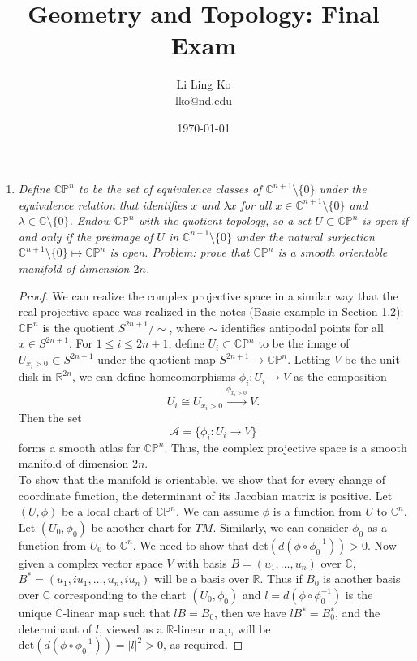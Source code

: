 \documentclass{article}
\begin{document}
\title{Geometry and Topology: Final Exam}
\author{Li Ling Ko\\ lko@nd.edu}
\date{\today}
\maketitle

\begin{enumerate}[label={\bf Q\arabic*:}]
  \item \it Define $\mathbb{C}\mathbb{P}^n$ to be the set of equivalence
    classes of $\mathbb{C}^{n+1}\setminus\{0\}$ under the equivalence
    relation that identifies $x$ and $\lambda x$ for all
    $x\in\mathbb{C}^{n+1}\setminus\{0\}$ and
    $\lambda\in\mathbb{C}\setminus\{0\}$. Endow $\mathbb{C}\mathbb{P}^n$
    with the quotient topology, so a set $U\subset\mathbb{C}\mathbb{P}^n$
    is open if and only if the preimage of $U$ in
    $\mathbb{C}^{n+1}\setminus\{0\}$ under the natural surjection
    $\mathbb{C}^{n+1}\setminus\{0\}\mapsto\mathbb{C}\mathbb{P}^n$ is open.
    Problem: prove that $\mathbb{C}\mathbb{P}^n$ is a smooth orientable
    manifold of dimension $2n$.

    \begin{proof}
      We can realize the complex projective space in a similar way that
      the real projective space was realized in the notes (Basic example in
      Section 1.2): $\mathbb{C}\mathbb{P}^n$ is the quotient
      $S^{2n+1}/\sim$, where $\sim$ identifies antipodal points for all
      $x\in S^{2n+1}$. For $1\leq i\leq 2n+1$, define
      $U_i\subset\mathbb{C}\mathbb{P}^n$ to be the image of
      $U_{x_i>0}\subset S^{2n+1}$ under the quotient map
      $S^{2n+1}\rightarrow\mathbb{C}\mathbb{P}^n$. Letting $V$ be the unit
      disk in $\mathbb{R}^{2n}$, we can define homeomorphisms
      $\phi_i:U_i\rightarrow V$ as the composition
      \[U_i\cong U_{x_i>0}\xrightarrow{\phi_{x_i>0}} V.\]
      Then the set
      \[\mathcal{A}=\{\phi_i:U_i\rightarrow V\}\]
      forms a smooth atlas for $\mathbb{C}\mathbb{P}^n$. Thus, the
      complex projective space is a smooth manifold of dimension $2n$. \\

      To show that the manifold is orientable, we show that for every
      change of coordinate function, the determinant of its Jacobian matrix
      is positive. Let $(U,\phi)$ be a local chart of
      $\mathbb{C}\mathbb{P}^n$. We can assume $\phi$ is a function from $U$
      to $\mathbb{C}^n$. Let $(U_0,\phi_0)$ be another chart for $TM$.
      Similarly, we can consider $\phi_0$ as a function from $U_0$ to
      $\mathbb{C}^n$. We need to show that
      $\text{det}(d(\phi\circ\phi_0^{-1}))>0$. Now given a complex vector
      space $V$ with basis $B=(u_1,\ldots,u_n)$ over $\mathbb{C}$,
      $B^*=(u_1,iu_1,\ldots,u_n,iu_n)$ will be a basis over $\mathbb{R}$.
      Thus if $B_0$ is another basis over $\mathbb{C}$ corresponding to the
      chart $(U_0,\phi_0)$ and $l=d(\phi\circ\phi_0^{-1})$ is the unique
      $\mathbb{C}$-linear map such that $lB=B_0$, then we have
      $lB^∗=B^∗_0$, and the determinant of $l$, viewed as a
      $\mathbb{R}$-linear map, will be
      $\text{det}(d(\phi\circ\phi_0^{-1}))=|l|^2>0$, as required.


\end{proof}
\end{enumerate}
\end{document}

